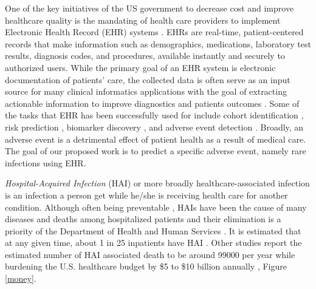 One of the key initiatives of the US government to decrease cost and improve healthcare quality is the mandating of health care providers to implement Electronic Health Record (EHR) systems \cite{ehr}. EHRs are real-time, patient-centered records that make information such as demographics, medications, laboratory test results, diagnosis codes, and procedures, available instantly and securely to authorized users. While the primary goal of an EHR system is electronic documentation of patients’ care, the collected data is often serve as an input source for many clinical informatics applications with the goal of extracting actionable information to improve diagnostics and patients outcomes \cite{yadav2018mining, rajkomar2018scalable, shickel2018deep}. Some of the tasks that EHR has been successfully used for include cohort identification \cite{kirby2016phekb, shivade2013review}, risk prediction \cite{ng2014paramo, wiens2012patient}, biomarker discovery \cite{bitton2010framingham}, and adverse event detection \cite{levinson2010adverse, torio2006trends}. Broadly, an adverse event is a detrimental effect of patient health as a result of medical care. The goal of our proposed work is to predict a specific adverse event, namely rare infections using EHR. 


\emph{Hospital-Acquired Infection} (HAI) or more broadly healthcare-associated infection is an infection a person get while he/she is receiving health care for another condition. Although often being preventable \cite{progress, yokoe2014compendium, umscheid2011estimating}, HAIs have been the cause of many diseases and deaths among hospitalized patients \cite{miller2011comparison, cdc, scott2009direct, klevens2007estimating} and their elimination is a priority of the Department of Health and Human Services \cite{hhs}. It is estimated that at any given time, about 1 in 25 inpatients have HAI \cite{magill2014multistate, hhs}. Other studies report the estimated number of HAI associated death to be around 99000 per year \cite{klevens2007estimating} while burdening the U.S. healthcare budget by \$5 to \$10 billion annually \cite{stone2005economic, zimlichman2013health}, Figure \ref{money}. 

